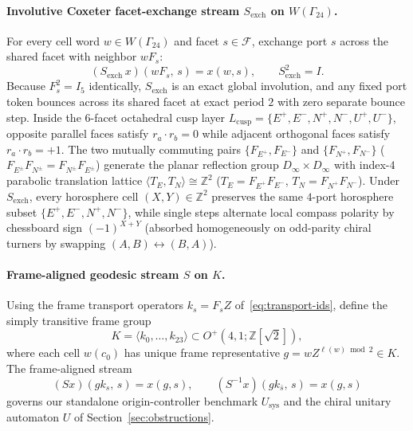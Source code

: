 \paragraph{Involutive Coxeter facet-exchange stream $S_{\mathrm{exch}}$ on $W(\Gamma_{24})$.}
For every cell word $w \in W(\Gamma_{24})$ and facet $s \in \mathcal{F}$, exchange port $s$ across the shared facet with neighbor $w F_s$:
\begin{equation}
\label{eq:exch-stream}
(S_{\mathrm{exch}}\,x)(w F_s,\, s) = x(w, s), \qquad S_{\mathrm{exch}}^2 = I.
\end{equation}
Because $F_s^2 = I_5$ identically, $S_{\mathrm{exch}}$ is an exact global involution, and any fixed port token bounces across its shared facet at exact period $2$ with zero separate bounce step. Inside the $6$-facet octahedral cusp layer $L_{\mathrm{cusp}} = \{E^+, E^-, N^+, N^-, U^+, U^-\}$, opposite parallel faces satisfy $r_a \cdot r_b = 0$ while adjacent orthogonal faces satisfy $r_a \cdot r_b = +1$. The two mutually commuting pairs $\{F_{E^+}, F_{E^-}\}$ and $\{F_{N^+}, F_{N^-}\}$ ($F_{E^\pm} F_{N^\pm} = F_{N^\pm} F_{E^\pm}$) generate the planar reflection group $D_\infty \times D_\infty$ with index-$4$ parabolic translation lattice $\langle T_E, T_N \rangle \cong \mathbb{Z}^2$ ($T_E = F_{E^+} F_{E^-}$, $T_N = F_{N^+} F_{N^-}$). Under $S_{\mathrm{exch}}$, every horosphere cell $(X,Y) \in \mathbb{Z}^2$ preserves the same $4$-port horosphere subset $\{E^+, E^-, N^+, N^-\}$, while single steps alternate local compass polarity by chessboard sign $(-1)^{X+Y}$ (absorbed homogeneously on odd-parity chiral turners by swapping $(A,B) \leftrightarrow (B,A)$).

\paragraph{Frame-aligned geodesic stream $S$ on $K$.}
Using the frame transport operators $k_s = F_s Z$ of~\eqref{eq:transport-ids}, define the simply transitive frame group
\begin{equation}
\label{eq:frame-group}
K = \langle k_0,\dots,k_{23}\rangle \subset O^+(4,1;\mathbb{Z}[\sqrt{2}]),
\end{equation}
where each cell $w(c_0)$ has unique frame representative $g = w Z^{\ell(w) \bmod 2} \in K$. The frame-aligned stream
\begin{equation}
\label{eq:stream-bijection}
(S x)(g k_s,\, s) = x(g, s), \qquad (S^{-1} x)(g k_{\bar{s}},\, s) = x(g, s)
\end{equation}
governs our standalone origin-controller benchmark $U_{\mathrm{sys}}$ and the chiral unitary automaton $U$ of Section~\ref{sec:obstructions}.

